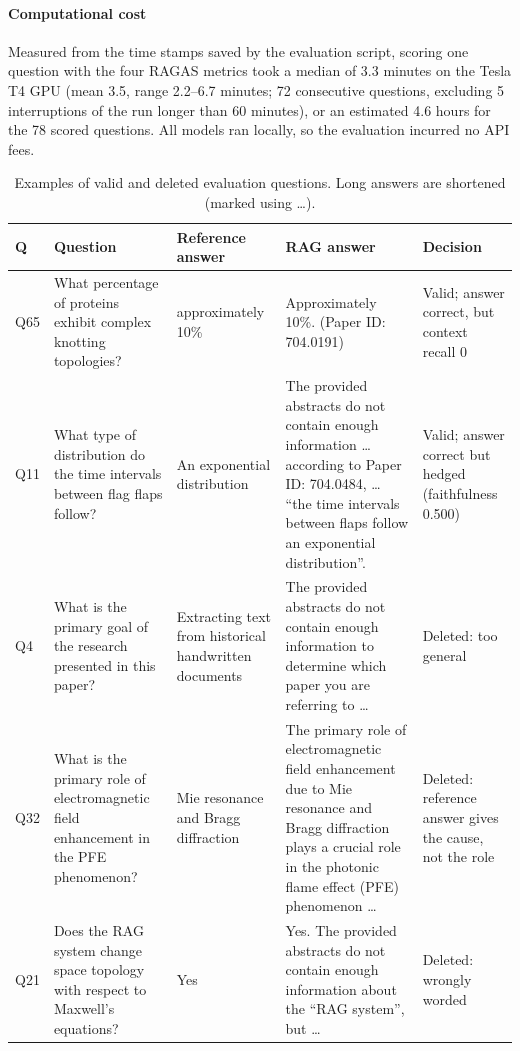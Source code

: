 \documentclass[bdcc,article,submit,pdftex,moreauthors]{Definitions/mdpi}
\begin{document}
\paragraph{Computational cost}
Measured from the time stamps saved by the evaluation script, scoring one question with the four RAGAS metrics took a median of 3.3 minutes on the Tesla T4 GPU (mean 3.5, range 2.2--6.7 minutes; 72 consecutive questions, excluding 5 interruptions of the run longer than 60 minutes), or an estimated 4.6 hours for the 78 scored questions. All models ran locally, so the evaluation incurred no API fees.

\begin{table}[H]
\centering
\caption{Examples of valid and deleted evaluation questions. Long answers are shortened (marked using \ldots).}
\label{tab:rag_examples}
\scriptsize
\begin{tabularx}{\textwidth}{p{0.6cm} X p{2.2cm} X p{2.4cm}}
\toprule
\textbf{Q} & \textbf{Question} & \textbf{Reference answer} & \textbf{RAG answer} & \textbf{Decision} \\
\midrule
Q65 & What percentage of proteins exhibit complex knotting topologies? & approximately 10\% & Approximately 10\%. (Paper ID: 704.0191) &Valid; answer correct, but context recall 0 \\
\midrule
Q11 & What type of distribution do the time intervals between flag flaps follow? & An exponential distribution & The provided abstracts do not contain enough information \ldots{} according to Paper ID: 704.0484, \ldots{} ``the time intervals between flaps follow an exponential distribution''. & Valid; answer correct but hedged (faithfulness 0.500) \\
\midrule
Q4 & What is the primary goal of the research presented in this paper? & Extracting text from historical handwritten documents & The provided abstracts do not contain enough information to determine which paper you are referring to \ldots & Deleted: too general \\
\midrule
Q32 & What is the primary role of electromagnetic field enhancement in the PFE phenomenon? & Mie resonance and Bragg diffraction & The primary role of electromagnetic field enhancement due to Mie resonance and Bragg diffraction plays a crucial role in the photonic flame effect (PFE) phenomenon \ldots & Deleted: reference answer gives the cause, not the role \\
\midrule
Q21 & Does the RAG system change space topology with respect to Maxwell's equations? & Yes & Yes. The provided abstracts do not contain enough information about the ``RAG system'', but \ldots & Deleted: wrongly worded \\
\bottomrule
\end{tabularx}
\end{table}
\end{document}
